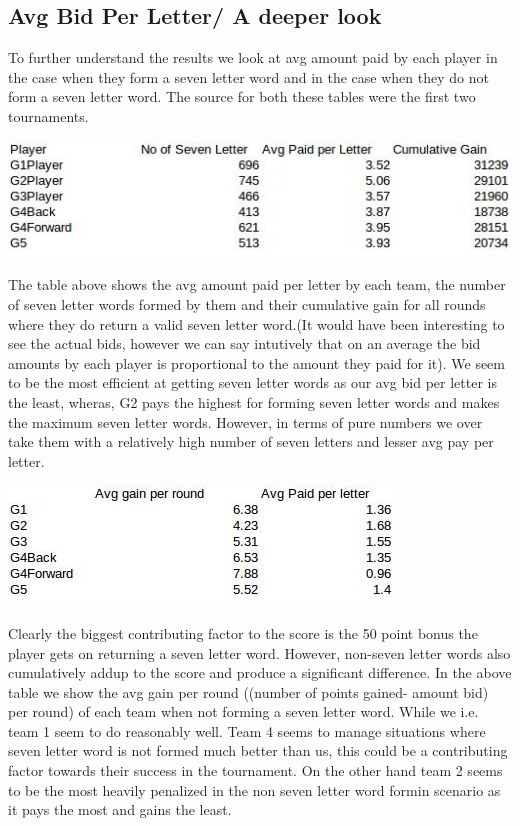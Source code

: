 \documentclass[11pt]{article}
\begin{document}
	\subsection{Avg Bid Per Letter/ A deeper look}
	To further understand the results we look at avg amount paid by each player in the case when they form a seven letter word and in the case when they do not form a seven letter word. The source for both these tables were the first two tournaments. 
	\begin{center}
\includegraphics[width=0.8 \textwidth]{AVGBidSevenY}
\end{center}
The table above shows the avg amount paid per letter by each team, the number of seven letter words formed by them and their cumulative gain for all rounds where they do return a valid seven letter word.(It would have been interesting to see the actual bids, however we can say intutively that on an average the bid amounts by each player is proportional to the amount they paid for it). We seem to be the most efficient at getting seven letter words as our avg bid per letter is the least, wheras, G2 pays the highest for forming seven letter words and makes the maximum seven letter words. However, in terms of pure numbers we over take them with a relatively high number of seven letters and lesser avg pay per letter. 
	\begin{center}
\includegraphics[width=0.6 \textwidth]{AVGBidSevenNN}
\end{center}
	Clearly the biggest contributing factor to the score is the 50 point bonus the player gets on returning a seven letter word. However, non-seven letter words also cumulatively addup to the score and produce a significant difference. In the above table we show the avg gain per round ((number of points gained- amount bid) per round) of each team when not forming a seven letter word. While we i.e. team 1 seem to do reasonably well. Team 4 seems to manage situations where seven letter word is not formed much better than us, this could be a contributing factor towards their success in the tournament. On the other hand team 2 seems to be the most heavily penalized in the non seven letter word formin scenario as it pays the most and gains the least. 
\end{document}
